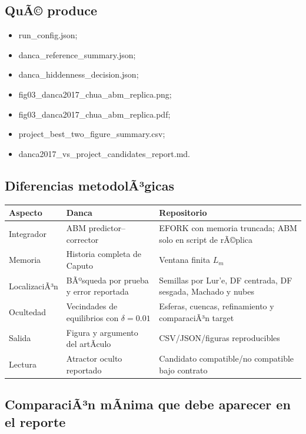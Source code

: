\documentclass[11pt]{article}
\DeclareRobustCommand{\codepath}[1]{\begingroup\Urlmuskip=0mu plus 2mu\path{#1}\endgroup}
\def\codepath#1{#1}%
\begin{document}
\subsection{QuÃ© produce}

\begin{itemize}
\item \codepath{run_config.json};
\item \codepath{danca_reference_summary.json};
\item \codepath{danca_hiddenness_decision.json};
\item \codepath{fig03_danca2017_chua_abm_replica.png};
\item \codepath{fig03_danca2017_chua_abm_replica.pdf};
\item \codepath{project_best_two_figure_summary.csv};
\item \codepath{danca2017_vs_project_candidates_report.md}.
\end{itemize}

\subsection{Diferencias metodolÃ³gicas}

\begin{center}
\small
\begin{tabular}{@{}L{0.28\textwidth}L{0.29\textwidth}L{0.31\textwidth}@{}}
\toprule
Aspecto & Danca & Repositorio\\
\midrule
Integrador & ABM predictor--corrector & EFORK con memoria truncada; ABM solo en script de rÃ©plica\\
Memoria & Historia completa de Caputo & Ventana finita \(L_m\)\\
LocalizaciÃ³n & BÃºsqueda por prueba y error reportada & Semillas por Lur'e, DF centrada, DF sesgada, Machado y nubes\\
Ocultedad & Vecindades de equilibrios con \(\delta=0.01\) & Esferas, cuencas, refinamiento y comparaciÃ³n target\\
Salida & Figura y argumento del artÃ­culo & CSV/JSON/figuras reproducibles\\
Lectura & Atractor oculto reportado & Candidato compatible/no compatible bajo contrato\\
\bottomrule
\end{tabular}
\end{center}

\subsection{ComparaciÃ³n mÃ­nima que debe aparecer en el reporte}
\end{document}
